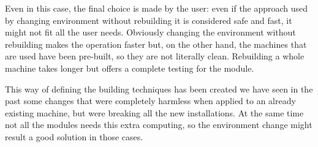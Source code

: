 \begin{itemize}
Even in this case, the final choice is made by the user: even if the
approach used by changing environment without rebuilding it is considered
safe and fast, it might not fit all the user needs. Obviously changing the
environment without rebuilding makes the operation faster but, on the
other hand, the machines that are used have been pre-built, so they are
not literally clean. Rebuilding a whole machine takes longer but offers
a complete testing for the module.

This way of defining the building techniques has been created we have seen
in the past some changes that were completely harmless when applied to an
already existing machine, but were breaking all the new installations. At
the same time not all the modules needs this extra computing, so the
environment change might result a good solution in those cases.

\end{itemize}





